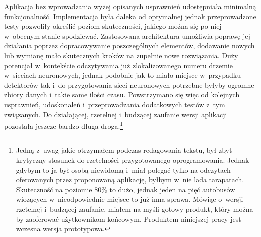 Aplikacja bez wprowadzania wyżej opisanych usprawnień udostępniała
minimalną funkcjonalność. Implementacja była daleka od optymalnej 
jednak przeprowadzone testy pozwoliły określić poziom skuteczności,
jakiego można się po niej w~obecnym stanie spodziewać. Zastosowana architektura
umożliwia poprawę jej działania poprzez dopracowywanie poszczególnych elementów,
dodawanie nowych lub wymianę mało skutecznych kroków na zupełnie nowe
rozwiązania. Duży potencjał w~kontekście odczytywania już zlokalizowanego
numeru drzemie w~sieciach neuronowych, jednak podobnie 
jak to miało miejsce w~przypadku detektorów tak i~do przygotowania
sieci neuronowych potrzebne byłyby ogromne zbiory danych i~takie same ilości czasu. 
Powstrzymano się więc od kolejnych usprawnień, udoskonaleń i~przeprowadzania
dodatkowych testów z~tym związanych. Do działającej, rzetelnej
i~budzącej zaufanie wersji aplikacji pozostała jeszcze bardzo długa droga.\footnote{Jedną z~uwag jakie otrzymałem podczas redagowania
	tekstu, był zbyt krytyczny stosunek do rzetelności przygotowanego
	oprogramowania. Jednak gdybym to ja był osobą niewidomą i~miał polegać
	tylko na odczytach oferowanych przez proponowaną aplikację,
	byłbym w~nie lada tarapatach. Skuteczność na poziomie 80\% to dużo,
	jednak jeden na pięć autobusów wiozących w~nieodpowiednie miejsce
	to już inna sprawa. Mówiąc o~wersji rzetelnej i~budzącej zaufanie,
	miałem na myśli gotowy produkt, który można by zaoferować użytkownikom
	końcowym. Produktem niniejszej pracy jest wczesna wersja prototypowa.}